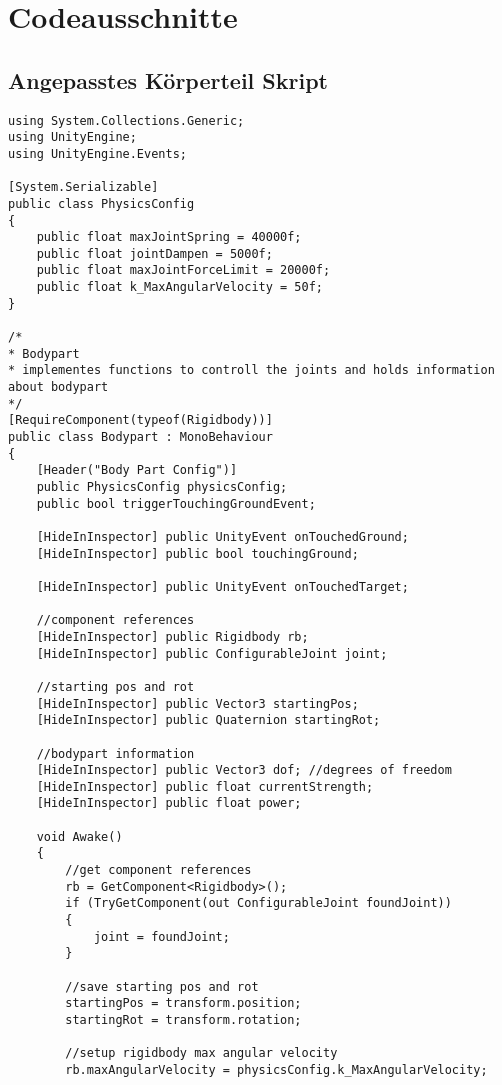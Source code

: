 \chapter{Codeausschnitte}
\section{Angepasstes Körperteil Skript}
\begin{lstlisting}[caption={Körperteil Skript},captionpos=b,label={lst:skript_körperteil}]
using System.Collections.Generic;
using UnityEngine;
using UnityEngine.Events;

[System.Serializable]
public class PhysicsConfig
{
    public float maxJointSpring = 40000f;
    public float jointDampen = 5000f;
    public float maxJointForceLimit = 20000f;
    public float k_MaxAngularVelocity = 50f;
}

/*
* Bodypart
* implementes functions to controll the joints and holds information about bodypart
*/
[RequireComponent(typeof(Rigidbody))]
public class Bodypart : MonoBehaviour
{
    [Header("Body Part Config")]
    public PhysicsConfig physicsConfig;
    public bool triggerTouchingGroundEvent;

    [HideInInspector] public UnityEvent onTouchedGround;
    [HideInInspector] public bool touchingGround;

    [HideInInspector] public UnityEvent onTouchedTarget;

    //component references
    [HideInInspector] public Rigidbody rb;
    [HideInInspector] public ConfigurableJoint joint;

    //starting pos and rot
    [HideInInspector] public Vector3 startingPos;
    [HideInInspector] public Quaternion startingRot;

    //bodypart information
    [HideInInspector] public Vector3 dof; //degrees of freedom
    [HideInInspector] public float currentStrength;
    [HideInInspector] public float power;

    void Awake()
    {
        //get component references
        rb = GetComponent<Rigidbody>();
        if (TryGetComponent(out ConfigurableJoint foundJoint))
        {
            joint = foundJoint;
        }

        //save starting pos and rot
        startingPos = transform.position;
        startingRot = transform.rotation;

        //setup rigidbody max angular velocity
        rb.maxAngularVelocity = physicsConfig.k_MaxAngularVelocity;


\end{lstlisting}
